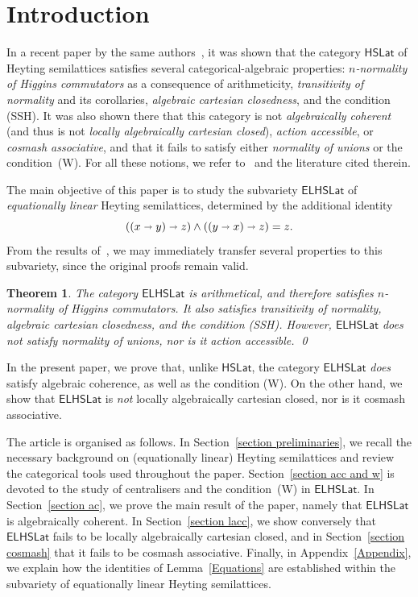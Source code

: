\documentclass[reqno,a4paper]{amsart}
\newtheorem{theorem}[lemma]{Theorem}
\theoremstyle{remark}
\theoremstyle{definition}
\newcommand{\noproof}{\hfill \qed}
\newcommand{\SSH}{{\rm (SSH)}}
\newcommand{\W}{{\rm (W)}}
\newcommand{\iimplies}{\shortrightarrow}
\newcommand{\HSLat}{\ensuremath{\mathsf{HSLat}}}
\newcommand{\ELHSLat}{\ensuremath{\mathsf{ELHSLat}}}
\begin{document}
\maketitle{}

\section{Introduction}

In a recent paper by the same authors~\cite{HSLat}, it was shown that the category \(\HSLat\) of Heyting semilattices satisfies several categorical-algebraic properties: \emph{\(n\)-normality of Higgins commutators} as a consequence of arithmeticity, \emph{transitivity of normality} and its corollaries, \emph{algebraic cartesian closedness}, and the condition \SSH{}. It was also shown there that this category is not \emph{algebraically coherent} (and thus is not \emph{locally algebraically cartesian closed}), \emph{action accessible}, or \emph{cosmash associative}, and that it fails to satisfy either \emph{normality of unions} or the condition~\W{}. For all these notions, we refer to~\cite{HSLat} and the literature cited therein.

The main objective of this paper is to study the subvariety \(\ELHSLat\) of \emph{equationally linear} Heyting semilattices, determined by the additional identity
\[
	((x \iimplies y) \iimplies z) \wedge ((y \iimplies x) \iimplies z) = z.
\]
From the results of~\cite{HSLat}, we may immediately transfer several properties to this subvariety, since the original proofs remain valid.

\begin{theorem}
	The category \(\ELHSLat\) is arithmetical, and therefore satisfies \(n\)-normality of Higgins commutators. It also satisfies transitivity of normality, algebraic cartesian closedness, and the condition \SSH{}. However, \(\ELHSLat\) does not satisfy normality of unions, nor is it action accessible. \noproof
\end{theorem}

In the present paper, we prove that, unlike \(\HSLat\), the category \(\ELHSLat\) \emph{does} satisfy algebraic coherence, as well as the condition \W{}. On the other hand, we show that \(\ELHSLat\) is \emph{not} locally algebraically cartesian closed, nor is it cosmash associative.

The article is organised as follows. In Section~\ref{section preliminaries}, we recall the necessary background on (equationally linear) Heyting semilattices and review the categorical tools used throughout the paper. Section~\ref{section acc and w} is devoted to the study of centralisers and the condition~\W{} in \(\ELHSLat\). In Section~\ref{section ac}, we prove the main result of the paper, namely that \(\ELHSLat\) is algebraically coherent. In Section~\ref{section lacc}, we show conversely that \(\ELHSLat\) fails to be locally algebraically cartesian closed, and in Section~\ref{section cosmash} that it fails to be cosmash associative. Finally, in Appendix~\ref{Appendix}, we explain how the identities of Lemma~\ref{Equations} are established within the subvariety of equationally linear Heyting semilattices.
\end{document}
